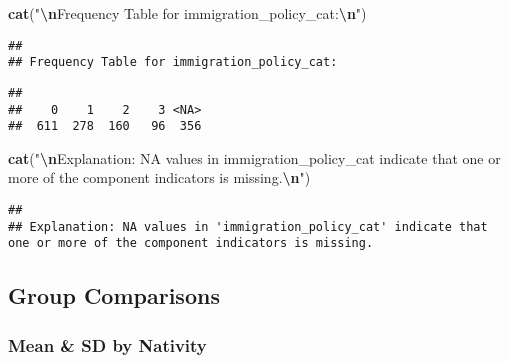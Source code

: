 \documentclass[
]{article}
\newenvironment{Shaded}{\begin{snugshade}}{\end{snugshade}}
\newcommand{\AttributeTok}[1]{\textcolor[rgb]{0.13,0.29,0.53}{#1}}
\newcommand{\FunctionTok}[1]{\textcolor[rgb]{0.13,0.29,0.53}{\textbf{#1}}}
\newcommand{\NormalTok}[1]{#1}
\newcommand{\SpecialCharTok}[1]{\textcolor[rgb]{0.81,0.36,0.00}{\textbf{#1}}}
\newcommand{\StringTok}[1]{\textcolor[rgb]{0.31,0.60,0.02}{#1}}
\begin{document}
\begin{Shaded}
\begin{Highlighting}[]
\FunctionTok{cat}\NormalTok{(}\StringTok{"}\SpecialCharTok{\textbackslash{}n}\StringTok{Frequency Table for immigration\_policy\_cat:}\SpecialCharTok{\textbackslash{}n}\StringTok{"}\NormalTok{)}
\end{Highlighting}
\end{Shaded}

\begin{verbatim}
## 
## Frequency Table for immigration_policy_cat:
\end{verbatim}

\begin{Shaded}
\end{Shaded}

\begin{verbatim}
## 
##    0    1    2    3 <NA> 
##  611  278  160   96  356
\end{verbatim}

\begin{Shaded}
\begin{Highlighting}[]
\FunctionTok{cat}\NormalTok{(}\StringTok{"}\SpecialCharTok{\textbackslash{}n}\StringTok{Explanation: NA values in \textquotesingle{}immigration\_policy\_cat\textquotesingle{} indicate that one or more of the component indicators is missing.}\SpecialCharTok{\textbackslash{}n}\StringTok{"}\NormalTok{)}
\end{Highlighting}
\end{Shaded}

\begin{verbatim}
## 
## Explanation: NA values in 'immigration_policy_cat' indicate that one or more of the component indicators is missing.
\end{verbatim}

\subsection{Group Comparisons}\label{group-comparisons}

\subsubsection{Mean \& SD by Nativity}\label{mean-sd-by-nativity}
\end{document}
